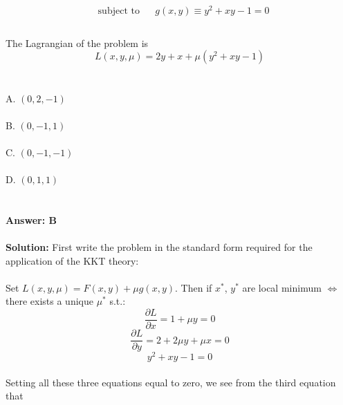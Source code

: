 \documentclass[prl,twocolumn,showpacs,preprintnumbers,superscriptaddress]{revtex4}
\theoremstyle{plain}
\theoremstyle{definition}
\begin{document}
\begin{widetext}
\begin{equation*}
\begin{aligned}
& \text{subject to}
& & g(x, y) \equiv y^2 + xy - 1 = 0 \\
\end{aligned}
\end{equation*}
\\
The Lagrangian of the problem is \\
\begin{equation}
    L(x, y, \mu) = 2y + x + \mu (y^2 + xy - 1) {}\nonumber
\end{equation}
\\
\\
\noindent A. $(0, 2, -1)$\\
\\
B. $(0, -1, 1)$\\
\\
C. $(0, -1, -1)$\\
\\
D. $(0, 1, 1)$
\\
\\
\\
\textbf{Answer: B}
\\
\\
\textbf{Solution:}
First write the problem in the standard form required for the application of the KKT theory:
\\
\\
Set $L(x, y, \mu) = F(x, y) + \mu g(x, y)$. 
Then if $x^*$, $y^*$ are local minimum $\Longleftrightarrow$ there exists a unique $\mu^*$
s.t.:
\begin{equation}
   \frac{\partial L}{\partial x} = 1 + \mu y = 0
\end{equation} 
\begin{equation}
   \frac{\partial L}{\partial y} = 2 + 2\mu y + \mu x = 0
\end{equation}
\begin{equation}
    y^2 + xy - 1 = 0
\end{equation} 
\\
Setting all these three equations equal to zero, we see from the third equation that

\end{widetext}
\end{document}
